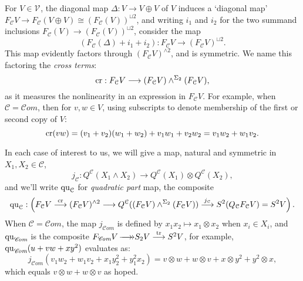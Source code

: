 \documentclass[11pt]{amsart}
\theoremstyle{plain}
\theoremstyle{definition}
\DeclareMathOperator{\trace}{tr}
\renewcommand{\to}{\longrightarrow}
\newcommand{\scrC}{\mathscr{C}}
\newcommand{\calC}{\mathcal{C}}
\newcommand{\calV}{\mathcal{V}}
\newcommand{\calc}{\mathcal{C}}
\theoremstyle{plain}
\newcommand{\vect}[2]{\calV^{#1}_{#2}}
\newcommand{\quadratic}{\textup{qu}}
\newcommand{\crossterms}{\textup{cr}}
\newcommand{\epi}{{\,\makebox[0cm][l]{\ensuremath\to}\to}}
\newcommand{\algs}{\scrC\!\textit{om}}
\begin{document}
\begin{CPiAlgs and CHalgs}
For $V\in\vect{}{}$, the diagonal map $\Delta:V\to V\oplus V$ of $V$ induces a `diagonal map' $F_\calC V\to F_\calC (V\oplus V)\cong (F_\calC (V))^{\sqcup 2}$, and writing $i_1$ and $i_2$ for the two summand inclusions $F_\calC (V)\to (F_\calC (V))^{\sqcup 2}$, consider the map
\[(F_\calC(\Delta)+i_1+i_2):F_\calC V\to (F_\calC V)^{\sqcup2}.\]
This map evidently factors through $(F_\calC V)^{\wedge 2}$, and is symmetric. We name this factoring the \emph{cross terms}:
\[\crossterms:F_\calC V\to (F_\calC V)\wedge^{\Sigma_2} (F_\calC V),\]
as it measures the nonlinearity in an expression in $F_\calC V$. For example, when $\calC=\algs$, then for $v,w\in V$, using subscripts to denote membership of the first or second copy of $V$:
\[\crossterms(vw)=(v_1+v_2)(w_1+w_2)+v_1w_1+v_2w_2=v_1w_2+w_1v_2.\]

In each case of interest to us, we will give a map, natural and symmetric in $X_1,X_2\in\calC$,
\[j_\calC:Q^\calC(X_1\wedge X_2)\to Q^\calC(X_1)\otimes Q^\calC(X_2),\]
and we'll write $\quadratic_\calC$ for \emph{quadratic part} map, the composite
\[\quadratic_\calC:\left(F_\calC V\overset{\crossterms}{\to}(F_\calC V)^{\wedge 2}\to Q^\calC((F_\calC V)\wedge^{\Sigma_2} (F_\calC V))\overset{j_\calC}{\to}S^2(Q_{\calc}F_{\calC}V)=S^2V\right).\]
When $\calC=\algs$, the map $j_{\algs}$ is defined by $x_1x_2\mapsto x_1\otimes x_2$ when $x_i\in X_i$, and $\quadratic_{\algs}$ is the composite $F_{\algs} V\epi S_2V\overset{\trace}{\to}S^2V$, for example,  $\quadratic_{\algs}(u+vw+xy^2)$ evaluates as:
\[j_{\algs}(v_1w_2+w_1v_2+x_1y_2^2+y_1^2x_2)=v\otimes w+w\otimes v+x\otimes y^2+y^2\otimes x,\]
which equals $v\otimes w+w\otimes v$ %
as hoped.


\end{CPiAlgs and CHalgs}
\end{document}
